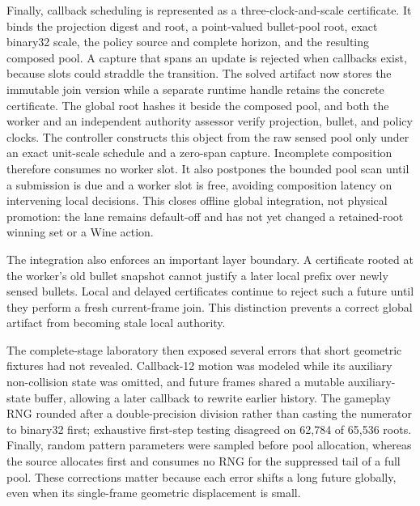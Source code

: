 \documentclass[10pt]{article}
\begin{document}
Finally, callback scheduling is represented as a three-clock-and-scale
certificate.  It binds the projection digest and root, a point-valued
bullet-pool root, exact binary32 scale, the policy source and complete horizon,
and the resulting composed pool.  A
capture that spans an update is rejected when callbacks exist, because slots
could straddle the transition.  The solved artifact now stores the immutable
join version while a separate runtime handle retains the concrete certificate.
The global root hashes it beside the composed pool, and both the worker and an
independent authority assessor verify projection, bullet, and policy clocks.
The controller constructs this object from the raw sensed pool only under an
exact unit-scale schedule and a zero-span capture.  Incomplete composition
therefore consumes no worker slot.  It also postpones the bounded pool scan
until a submission is due and a worker slot is free, avoiding composition
latency on intervening local decisions.  This closes offline global integration,
not physical promotion: the lane remains default-off and has not yet changed a
retained-root winning set or a Wine action.

The integration also enforces an important layer boundary.  A certificate
rooted at the worker's old bullet snapshot cannot justify a later local prefix
over newly sensed bullets.  Local and delayed certificates continue to reject
such a future until they perform a fresh current-frame join.  This distinction
prevents a correct global artifact from becoming stale local authority.

The complete-stage laboratory then exposed several errors that short
geometric fixtures had not revealed.  Callback-12 motion was modeled while
its auxiliary non-collision state was omitted, and future frames shared a
mutable auxiliary-state buffer, allowing a later callback to rewrite earlier
history.  The gameplay RNG rounded after a double-precision division rather
than casting the numerator to binary32 first; exhaustive first-step testing
disagreed on 62,784 of 65,536 roots.  Finally, random pattern parameters were
sampled before pool allocation, whereas the source allocates first and
consumes no RNG for the suppressed tail of a full pool.  These corrections
matter because each error shifts a long future globally, even when its
single-frame geometric displacement is small.
\end{document}
